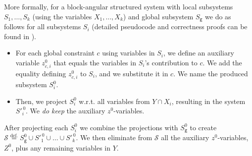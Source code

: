 \documentclass{llncs}
\newcommand{\trt}[1]{\texttt{#1}}
\begin{document}
More formally, for a block-angular structured system with local subsystems $S_1,\ldots, S_k$ (using the variables $X_1,\ldots, X_k$) and global subsystem $S_\texttt{g}$
we do as follows for all subsystems $S_i$ (detailed pseudocode and correctness proofs can be found in \cite{mytechrep}). 
\begin{itemize}[noitemsep,topsep=0pt]%
\item For each global constraint $c$ using variables in $S_i$, we define an auxiliary variable $z^0_{c,i}$ that equals the variables in $S_i$'s contribution to $c$. We add the equality defining $z^0_{c,i}$ to $S_i$, and we substitute it in $c$. 
We name the produced subsystem $S_i^0$. 
\item Then, we project $S_i^0$ w.r.t. all variables from $Y\cap X_i$, resulting in the system $S'^{\,0}_i$. We \emph{do keep} the auxiliary $z^0$-variables. 
\end{itemize}
After projecting each $S_i^0$ we combine the projections with $S_\trt{g}^0$ to create $\mathcal{S} \overset{\text{def.}}{=}S^0_\trt{g} \cup S'^{\,0}_1\cup \ldots \cup S'^{\,0}_k$.
We then eliminate from $\mathcal{S}$ all the auxiliary $z^0$-variables, $Z^0$, plus any remaining variables in $Y$. 
\end{document}
